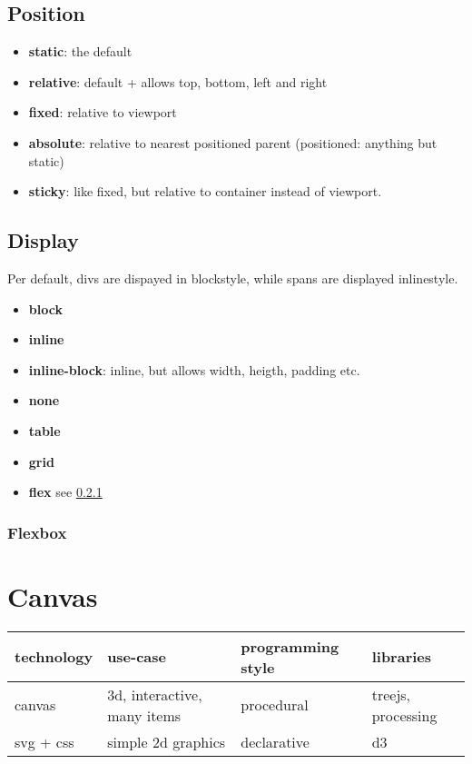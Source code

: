\subsection{Position}
\begin{itemize}
    \item \textbf{static}: the default
    \item \textbf{relative}: default + allows top, bottom, left and right
    \item \textbf{fixed}: relative to viewport
    \item \textbf{absolute}: relative to nearest positioned parent (positioned: anything but static)
    \item \textbf{sticky}: like fixed, but relative to container instead of viewport.
\end{itemize}

\subsection{Display}
Per default, divs are dispayed in blockstyle, while spans are displayed inlinestyle.
\begin{itemize}
    \item \textbf{block}
    \item \textbf{inline}
    \item \textbf{inline-block}: inline, but allows width, heigth, padding etc.
    \item \textbf{none}
    \item \textbf{table}
    \item \textbf{grid}
    \item \textbf{flex} see \ref{flexbox}
\end{itemize}

\subsubsection{Flexbox}\label{flexbox}

\section{Canvas}

\begin{table}[h]
    \begin{tabular}{@{}llll@{}}
    \toprule
    technology & use-case                    & programming style & libraries          \\ 
    \midrule
    canvas     & 3d, interactive, many items & procedural        & treejs, processing \\
    svg + css  & simple 2d graphics          & declarative       & d3                 \\ 
    \bottomrule
    \end{tabular}
    \end{table}